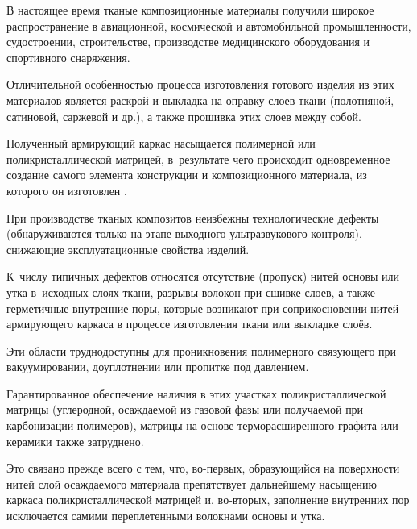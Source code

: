 \date{07/X/2013} %







\maketitle




В настоящее время тканые композиционные материалы получили широкое распространение в авиационной, космической и автомобильной промышленности, судостроении, строительстве, производстве медицинского оборудования и спортивного снаряжения. 

Отличительной особенностью процесса изготовления готового изделия из этих материалов является раскрой и выкладка на оправку слоев ткани (полотняной, сатиновой, саржевой и др.), а также прошивка этих слоев между собой. 

Полученный армирующий каркас насыщается полимерной или поликристаллической матрицей, в~результате чего происходит одновременное создание самого элемента конструкции и композиционного материала, из которого он изготовлен \cite{dedkov:bib:surovikin}.



При производстве тканых композитов неизбежны технологические дефекты (обнаруживаются только на этапе выходного ультразвукового контроля), снижающие эксплуатационные свойства изделий. 

К~числу типичных дефектов относятся отсутствие (пропуск) нитей основы или утка в~исходных слоях ткани, разрывы волокон при сшивке слоев, а также герметичные внутренние поры, которые возникают при соприкосновении нитей армирующего каркаса в процессе изготовления ткани или выкладке слоёв. 

Эти области труднодоступны для проникновения полимерного связующего при вакуумировании, доуплотнении или пропитке под давлением. 

Гарантированное обеспечение наличия в этих участках поликристаллической матрицы (углеродной, осаждаемой из газовой фазы или получаемой при карбонизации полимеров), матрицы на основе терморасширенного графита или керамики также затруднено. 

Это связано прежде всего с тем, что, во-первых, образующийся на поверхности нитей слой осаждаемого материала препятствует дальнейшему насыщению каркаса поликристаллической матрицей и, во-вторых, заполнение внутренних пор исключается самими переплетенными волокнами основы и утка.



